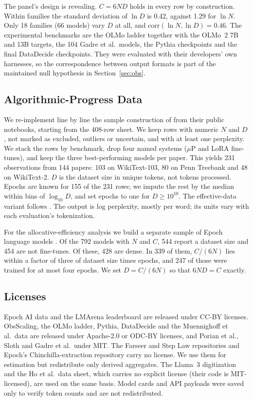The panel's design is revealing. $C=6ND$ holds in every row by construction. Within families the standard deviation of
$\ln D$ is 0.42, against 1.29 for $\ln N$. Only 18 families (66 models) vary $D$ at all, and
$\mathrm{corr}(\ln N,\ln D)=0.46$. The experimental benchmarks are the OLMo ladder together
with the OLMo~2 7B and 13B targets, the 104 Gadre et al.\ models, the Pythia checkpoints and the final DataDecide
checkpoints. They were evaluated with their developers' own harnesses, so the correspondence between output formats is
part of the maintained null hypothesis in Section~\ref{sec:obs}.

\subsection{Algorithmic-Progress Data}\label{app:ho}

We re-implement line by line the sample construction of \citet{ho2024algorithmic} from their public notebooks, starting
from the 408-row sheet. We keep rows with numeric $N$ and $D$, not marked as excluded, outliers or uncertain, and with
at least one perplexity. We stack the rows by benchmark, drop four named systems ($\mu$P and LoRA fine-tunes), and keep the three
best-performing models per paper. This yields 231 observations from 144 papers: 103 on WikiText-103, 80 on Penn
Treebank and 48 on WikiText-2. $D$ is the dataset size in unique tokens, not tokens processed. Epochs are known for 155
of the 231 rows; we impute the rest by the median within bins of $\log_{10}D$, and set epochs to one for $D\ge10^{10}$.
The effective-data variant follows \citet{muennighoff2023scaling}. The output is log perplexity, mostly per word; its units
vary with each evaluation's tokenization.

For the allocative-efficiency analysis we build a separate sample of Epoch language models
\citep{epochai2026data}. Of the 792 models with $N$ and $C$, 544 report a dataset size and 454 are not fine-tunes. Of
these, 428 are dense. In 339 of them, $C/(6N)$ lies within a factor of three of dataset size times epochs, and 247 of
those were trained for at most four epochs. We set $D=C/(6N)$ so that $6ND=C$ exactly.

\subsection{Licenses}\label{app:licenses}

Epoch AI data and the LMArena leaderboard are released under CC-BY licenses. ObsScaling, the OLMo ladder, Pythia,
DataDecide and the Muennighoff et al.\ data are released under Apache-2.0 or ODC-BY licenses, and Porian et al., Sloth
and Gadre et al.\ under MIT. The Farseer and Step Law repositories and Epoch's Chinchilla-extraction repository carry no
license. We use them for estimation but redistribute only derived aggregates. The Llama~3 digitization and the Ho et al.\
data sheet, which carries no explicit license (their code is MIT-licensed), are used on the same basis. Model cards and API payloads were saved only to verify token counts and are not redistributed.
